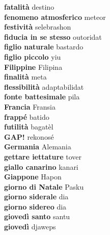 \textbf{ fatalità  } destino \\
\textbf{ fenomeno atmosferico  } meteor \\
\textbf{ festività  } selebrashon \\
\textbf{ fiducia in se stesso  } outoridat \\
\textbf{ figlio naturale  } bastardo \\
\textbf{ figlio piccolo  } yiu \\
\textbf{ Filippine  } Filipina \\
\textbf{ finalità  } meta \\
\textbf{ flessibilità  } adaptabilidat \\
\textbf{ fonte battesimale  } pila \\
\textbf{ Francia  } Fransia \\
\textbf{ frappé  } batido \\
\textbf{ futilità  } bagatèl \\
\textbf{ GAP!  } rekonosé \\
\textbf{ Germania  } Alemania \\
\textbf{ gettare iettature  } tover \\
\textbf{ giallo canarino  } kanari \\
\textbf{ Giappone  } Hapon \\
\textbf{ giorno di Natale  } Pasku \\
\textbf{ giorno siderale  } dia \\
\textbf{ giorno sidereo  } dia \\
\textbf{ giovedì santo  } santu \\
\textbf{ giovedì  } djaweps \\
